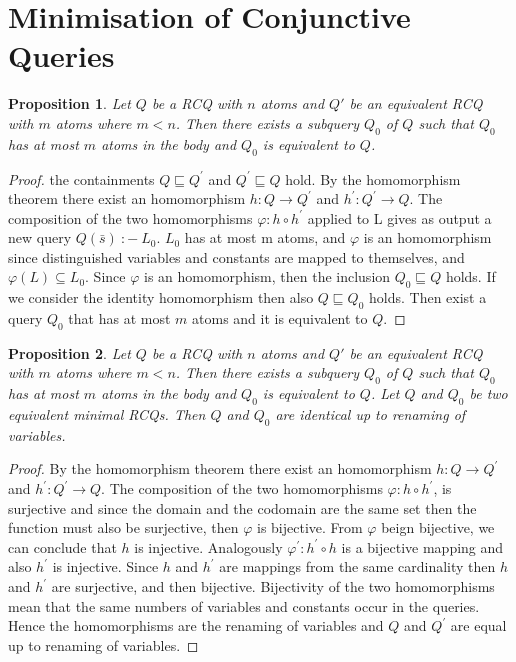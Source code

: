 \documentclass[a4paper,12pt]{article}
\newtheorem{prop}{Proposition}
\newcommand{\query}[3]{\ensuremath{{#1}({#2})\:{:}{-}\:{#3}}}
\renewcommand{\phi}{\varphi}
\begin{document}
\section{Minimisation of Conjunctive Queries}


\begin{prop} Let $Q$ be a RCQ with $n$ atoms and $Q'$ be an equivalent RCQ with $m$ atoms where $m < n$. Then there exists a subquery $Q_0$ of $Q$ such that $Q_0$ has at most $m$ atoms in the body and $Q_0$ is equivalent to $Q$.
\end{prop}

\begin{proof}
the containments $Q \sqsubseteq Q^{'}$ and $Q^{'} \sqsubseteq Q$ hold. By the homomorphism theorem there exist an homomorphism $h : Q \rightarrow Q^{'} $ and $h^{'} : Q^{'} \rightarrow Q $. The composition of the two homomorphisms $\phi : h \circ h^{'}$ applied to L gives as output a new query $\query{Q}{\bar{s}}{L_0}$. $L_0$ has at most m atoms, and $\phi$ is an homomorphism since distinguished variables and constants are mapped to themselves, and $\phi (L) \subseteq L_0$.
Since $\phi$ is an homomorphism, then the inclusion $Q_0 \sqsubseteq Q$ holds. 
If we consider the identity homomorphism then also $Q \sqsubseteq Q_0$ holds. Then exist a query $Q_0$ that has at most $m$ atoms and it is equivalent to $Q$.

\end{proof}

\begin{prop} Let $Q$ be a RCQ with $n$ atoms and $Q'$ be an equivalent RCQ with $m$ atoms where $m < n$. Then there exists a subquery $Q_0$ of $Q$ such that $Q_0$ has at most $m$ atoms in the body and $Q_0$ is equivalent to $Q$.
Let $Q$ and $Q_0$ be two equivalent minimal RCQs. Then $Q$ and $Q_0$
are identical up to renaming of variables.
\end{prop}

\begin{proof}
By the homomorphism theorem there exist an homomorphism $h : Q \rightarrow Q^{'} $ and $h^{'} : Q^{'} \rightarrow Q $. The composition of the two homomorphisms $\phi : h \circ h^{'}$, is surjective and since the domain and the codomain are the same set then the function must also be surjective, then $\phi$ is bijective. From $\phi$ beign bijective, we can conclude that $h$ is injective. Analogously $\phi^{'} : h^{'} \circ h$ is a bijective mapping  and also $h^{'}$ is injective. Since $h$ and $h^{'}$ are  mappings from the same cardinality then $h$ and $h^{'}$ are surjective, and then bijective. Bijectivity of the two homomorphisms mean that the same numbers of variables and constants occur in the queries. Hence the homomorphisms are the renaming of variables and $Q$ and $Q^{'}$ are equal up to renaming of variables.


\end{proof}
\end{document}
